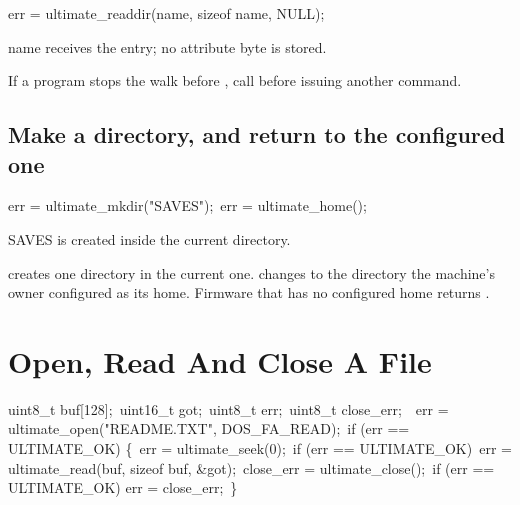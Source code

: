 \begin{listingbox}
err = ultimate\_readdir(name, sizeof name, NULL);
\end{listingbox}

\begin{resultbox}
name receives the entry; no attribute byte is stored.
\end{resultbox}

If a program stops the walk before , call
 before issuing another command.

\subsection*{Make a directory, and return to the configured one}

\begin{listingbox}
err = ultimate\_mkdir("SAVES");\
err = ultimate\_home();
\end{listingbox}

\begin{resultbox}
SAVES is created inside the current directory.
\end{resultbox}

 creates one directory in the current one.
\cmd{ultimate\_home()} changes to the directory the machine's owner configured
as its home. Firmware that has no configured home returns
.


\section{Open, Read And Close A File}

\begin{listingbox}
uint8\_t buf[128];\
uint16\_t got;\
uint8\_t err;\
uint8\_t close\_err;\
\
err = ultimate\_open("README.TXT", DOS\_FA\_READ);\
if (err == ULTIMATE\_OK) \{\
\hspace*{1em}err = ultimate\_seek(0);\
\hspace*{1em}if (err == ULTIMATE\_OK)\
\hspace*{2em}err = ultimate\_read(buf, sizeof buf, \&got);\
\hspace*{1em}close\_err = ultimate\_close();\
\hspace*{1em}if (err == ULTIMATE\_OK) err = close\_err;\
\}
\end{listingbox}

